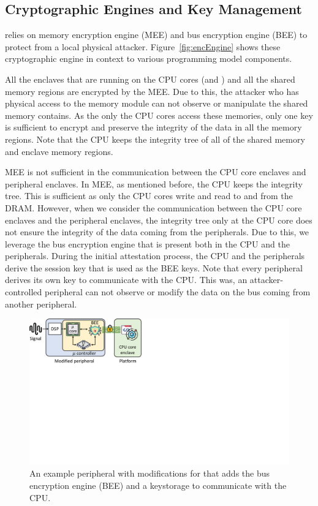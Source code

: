 \subsection{Cryptographic Engines and Key Management}

  \name relies on memory encryption engine (MEE) and bus encryption engine (BEE) to protect from a local physical attacker. Figure~\ref{fig:encEngine} shows these cryptographic engine in context to various \name programming model components.

  All the enclaves that are running on the CPU cores (\app and \ce) and all the shared memory regions are encrypted by the MEE. Due to this, the attacker who has physical access to the memory module can not observe or manipulate the shared memory contains. As the only the CPU cores access these memories, only one key is sufficient to encrypt and preserve the integrity of the data in all the memory regions. Note that the CPU keeps the integrity tree of all of the shared memory and enclave memory regions.

  MEE is not sufficient in the communication between the CPU core enclaves and peripheral enclaves. In MEE, as mentioned before, the CPU keeps the integrity tree. This is sufficient as only the CPU cores write and read to and from the DRAM. However, when we consider the communication between the CPU core enclaves and the peripheral enclaves, the integrity tree only at the CPU core does not ensure the integrity of the data coming from the peripherals. Due to this, we leverage the bus encryption engine that is present both in the CPU and the peripherals. During the initial attestation process, the CPU and the peripherals derive the session key that is used as the BEE keys. Note that every peripheral derives its own key to communicate with the CPU. This was, an attacker-controlled peripheral can not observe or modify the data on the bus coming from another peripheral.  


 \begin{figure}[t]
   \centering
   \includegraphics[trim={0 13cm 18cm 0}, clip, width=0.7\linewidth]{chapters/PIE/images/peripheral.pdf}
   \caption{An example peripheral with modifications for \name{} that adds the bus encryption engine (BEE) and a keystorage to communicate with the CPU.}
   \label{fig:sensor}
 \end{figure}




